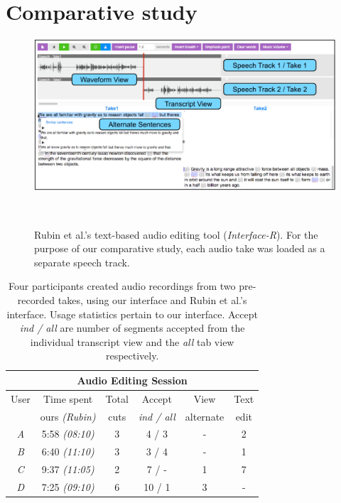 \section{Comparative study}
\begin{figure}
\centering
  \includegraphics[width=1.0\columnwidth]{figures/interfaceR.pdf}
  \caption{Rubin et al.'s text-based audio editing tool (\textit{Interface-R}). For the purpose of our comparative study, each audio take was loaded as a separate speech track.}~\label{fig:interface-r}
\end{figure}


\begin{table}[t]
\center
{}
\begin{tabular}{c|cccccc}
\multicolumn{7}{c}{\textbf{Audio Editing Session}}\\\hline
{User}&\multicolumn{2}{c}{Time spent}& {Total} & {Accept}
&{View}&{Text} \\
{}&\multicolumn{2}{c}{ours \textit{(Rubin)}}&{cuts}&{\textit{ind
/ all}}&{alternate}&{edit}
\\\hline
\textit{A}&\multicolumn{2}{c}{5:58 \textit{(08:10)}}&{3}& {4
/ 3}&{-}&{2}\\
\textit{B}  &\multicolumn{2}{c}{6:40 \textit{(11:10)}}&{3}&{3
/ 4}&{-}&{1}\\
\textit{C}&\multicolumn{2}{c}{9:37 \textit{(11:05)}}&{2}& {7
/ -}&{1}&{7}\\
\textit{D}&\multicolumn{2}{c}{7:25 \textit{(09:10)}}&{6}& {10
/ 1}&{3}&{-}
\\\hline
\end{tabular} 
\label{tab:editing}
\caption{Four participants created audio
recordings from two pre-recorded takes, using our interface and
Rubin et al.'s interface. Usage statistics pertain to our interface.
Accept \textit{ind / all} are number of segments accepted from
the individual transcript view and the \textit{all} tab view
respectively.}
\end{table} 


